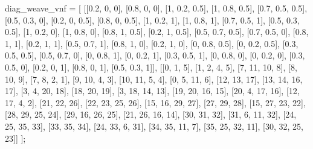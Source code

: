 diag_weave_vnf = [
    [[0.2, 0, 0], [0.8, 0, 0], [1, 0.2, 0.5], [1, 0.8, 0.5], [0.7, 0.5, 0.5],
     [0.5, 0.3, 0], [0.2, 0, 0.5], [0.8, 0, 0.5], [1, 0.2, 1], [1, 0.8, 1],
     [0.7, 0.5, 1], [0.5, 0.3, 0.5], [1, 0.2, 0], [1, 0.8, 0], [0.8, 1, 0.5],
     [0.2, 1, 0.5], [0.5, 0.7, 0.5], [0.7, 0.5, 0], [0.8, 1, 1], [0.2, 1, 1],
     [0.5, 0.7, 1], [0.8, 1, 0], [0.2, 1, 0], [0, 0.8, 0.5], [0, 0.2, 0.5],
     [0.3, 0.5, 0.5], [0.5, 0.7, 0], [0, 0.8, 1], [0, 0.2, 1], [0.3, 0.5, 1],
     [0, 0.8, 0], [0, 0.2, 0], [0.3, 0.5, 0], [0.2, 0, 1], [0.8, 0, 1], [0.5, 0.3, 1]],
    [[0, 1, 5], [1, 2, 4, 5], [7, 11, 10, 8], [8, 10, 9], [7, 8, 2, 1], [9, 10, 4, 3],
     [10, 11, 5, 4], [0, 5, 11, 6], [12, 13, 17], [13, 14, 16, 17], [3, 4, 20, 18],
     [18, 20, 19], [3, 18, 14, 13], [19, 20, 16, 15], [20, 4, 17, 16], [12, 17, 4, 2],
     [21, 22, 26], [22, 23, 25, 26], [15, 16, 29, 27], [27, 29, 28], [15, 27, 23, 22],
     [28, 29, 25, 24], [29, 16, 26, 25], [21, 26, 16, 14], [30, 31, 32], [31, 6, 11, 32],
     [24, 25, 35, 33], [33, 35, 34], [24, 33, 6, 31], [34, 35, 11, 7],
     [35, 25, 32, 11], [30, 32, 25, 23]]
];